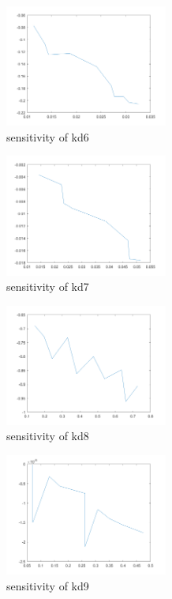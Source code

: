 \begin{figure}[H]
	\begin{figure}[H]
		\begin{subfigure}{0.5\textwidth}
			\includegraphics[height=4cm]{d6.png}
			\caption{sensitivity of kd6}
		\end{subfigure}%
		\begin{subfigure}{0.5\textwidth}
			\includegraphics[height=4cm]{d7.png}
			\caption{sensitivity of kd7}
		\end{subfigure}
		\begin{subfigure}{0.5\textwidth}
			\includegraphics[height=4cm]{d8.png}
			\caption{sensitivity of kd8}
		\end{subfigure}%
		\begin{subfigure}{0.5\textwidth}
			\includegraphics[height=4cm]{d9.png}
			\caption{sensitivity of kd9}
		\end{subfigure}
		\begin{subfigure}{0.5\textwidth}

\end{subfigure}
\end{figure}
\end{figure}
